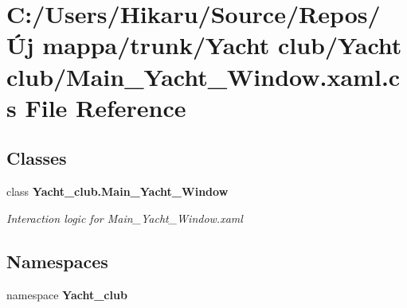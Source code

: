 \section{C\+:/\+Users/\+Hikaru/\+Source/\+Repos/Új mappa/trunk/\+Yacht club/\+Yacht club/\+Main\+\_\+\+Yacht\+\_\+\+Window.xaml.\+cs File Reference}
\label{_main___yacht___window_8xaml_8cs}
\subsection*{Classes}
\begin{DoxyCompactItemize}
\item 
class \textbf{ Yacht\+\_\+club.\+Main\+\_\+\+Yacht\+\_\+\+Window}
\begin{DoxyCompactList}\small\item\em Interaction logic for Main\+\_\+\+Yacht\+\_\+\+Window.\+xaml \end{DoxyCompactList}\end{DoxyCompactItemize}
\subsection*{Namespaces}
\begin{DoxyCompactItemize}
\item 
namespace \textbf{ Yacht\+\_\+club}
\end{DoxyCompactItemize}

